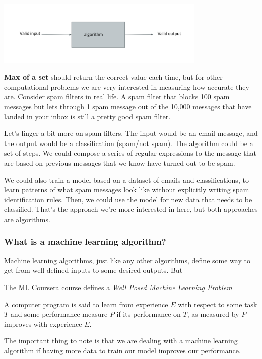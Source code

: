 \documentclass[12pt]{article}
\begin{document}
\includegraphics[width={0.75\textwidth}]{algo-abstract}

\textbf{Max of a set} should return the correct value each time, but for other computational problems we are very interested in measuring how accurate they are. Consider spam filters in real life. A spam filter that blocks 100 spam messages but lets through 1 spam message out of the 10,000 messages that have landed in your inbox is still a pretty good spam filter.

Let's linger a bit more on spam filters. The input would be an email message, and the output would be a classification (spam/not spam). The algorithm could be a set of steps. We could compose a series of regular expressions to the message that are based on previous messages that we know have turned out to be spam.

We could also train a model based on a dataset of emails and classifications, to learn patterns of what spam messages look like without explicitly writing spam identification rules. Then, we could use the model for new data that needs to be classified. That's the approach we're more interested in here, but both approaches are algorithms.

\subsubsection{What is a machine learning algorithm?}

Machine learning algorithms, just like any other algorithms, define some way to get from well defined inputs to some desired outputs. But

The ML Coursera course defines a \textit{Well Posed Machine Learning Problem}

A computer program is said to learn from experience $E$ with respect to some task $T$ and some performance measure $P$ 
if its performance on $T$, as measured by $P$ improves with experience $E$.

The important thing to note is that we are dealing with a machine learning algorithm if having more data to train our model improves our performance.
\end{document}
